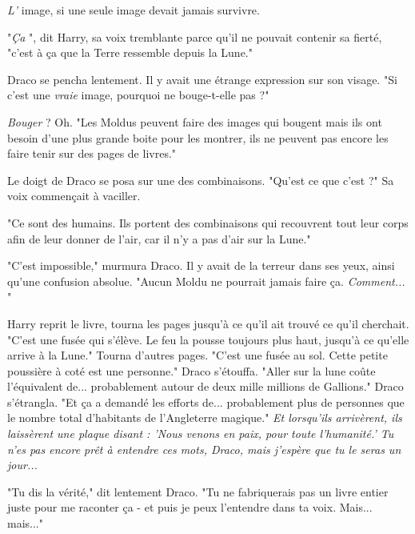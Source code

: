 \emph{L'} image, si une seule image devait jamais survivre.

"\emph{Ça} ", dit Harry, sa voix tremblante parce qu'il ne pouvait contenir sa fierté, "c'est à ça que la Terre ressemble depuis la Lune."

Draco se pencha lentement. Il y avait une étrange expression sur son visage. "Si c'est une \emph{vraie}  image, pourquoi ne bouge-t-elle pas ?"

\emph{Bouger}  ? Oh. "Les Moldus peuvent faire des images qui bougent mais ils ont besoin d'une plus grande boite pour les montrer, ils ne peuvent pas encore les faire tenir sur des pages de livres."

Le doigt de Draco se posa sur une des combinaisons. "Qu'est ce que c'est ?" Sa voix commençait à vaciller.

"Ce sont des humains. Ils portent des combinaisons qui recouvrent tout leur corps afin de leur donner de l'air, car il n'y a pas d'air sur la Lune."

"C'est impossible," murmura Draco. Il y avait de la terreur dans ses yeux, ainsi qu'une confusion absolue. "Aucun Moldu ne pourrait jamais faire ça. \emph{Comment...} "

Harry reprit le livre, tourna les pages jusqu'à ce qu'il ait trouvé ce qu'il cherchait. "C'est une fusée qui s'élève. Le feu la pousse toujours plus haut, jusqu'à ce qu'elle arrive à la Lune." Tourna d'autres pages. "C'est une fusée au sol. Cette petite poussière à coté est une personne." Draco s'étouffa. "Aller sur la lune coûte l'équivalent de... probablement autour de deux mille millions de Gallions." Draco s'étrangla. "Et ça a demandé les efforts de... probablement plus de personnes que le nombre total d'habitants de l'Angleterre magique." \emph{Et lorsqu'ils arrivèrent, ils laissèrent une plaque disant : 'Nous venons en paix, pour toute l'humanité.' Tu n'es pas encore prêt à entendre ces mots, Draco, mais j'espère que tu le seras un jour...} 

"Tu dis la vérité," dit lentement Draco. "Tu ne fabriquerais pas un livre entier juste pour me raconter ça - et puis je peux l'entendre dans ta voix. Mais... mais..."

